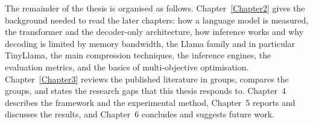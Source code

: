 The remainder of the thesis is organised as follows. Chapter~\ref{Chapter2} gives the background needed to read the later chapters: how a language model is measured, the transformer and the decoder-only architecture, how inference works and why decoding is limited by memory bandwidth, the Llama family and in particular TinyLlama, the main compression techniques, the inference engines, the evaluation metrics, and the basics of multi-objective optimisation. Chapter~\ref{Chapter3} reviews the published literature in groups, compares the groups, and states the research gaps that this thesis responds to. Chapter~4 describes the framework and the experimental method, Chapter~5 reports and discusses the results, and Chapter~6 concludes and suggests future work.
